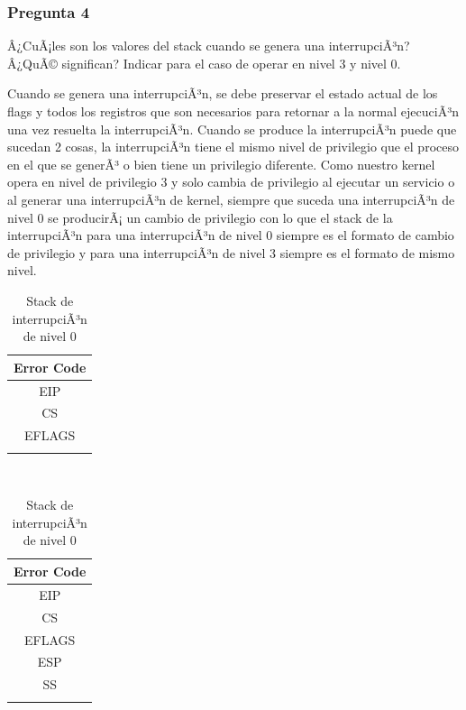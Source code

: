 \documentclass[10pt, a4paper]{article}
\begin{document}
\subsubsection*{Pregunta 4}
 \begin{framed}
Â¿CuÃ¡les son los valores del stack cuando se genera una interrupciÃ³n? Â¿QuÃ© significan? Indicar para el caso de operar en nivel 3 y nivel 0.
\end{framed}
Cuando se genera una interrupciÃ³n, se debe preservar el estado actual de los flags y todos los registros que son necesarios para retornar a la normal ejecuciÃ³n una vez resuelta la interrupciÃ³n.
Cuando se produce la interrupciÃ³n puede que sucedan 2 cosas, la interrupciÃ³n tiene el mismo nivel de privilegio que el proceso en el que se generÃ³ o bien tiene un privilegio diferente. Como nuestro kernel opera en nivel de privilegio 3 y solo cambia de privilegio al ejecutar un servicio o al generar una interrupciÃ³n de kernel, siempre que suceda una interrupciÃ³n de nivel 0 se producirÃ¡ un cambio de privilegio con lo que el stack de la interrupciÃ³n para una interrupciÃ³n de nivel 0 siempre es el formato de cambio de privilegio y para una interrupciÃ³n de nivel 3 siempre es el formato de mismo nivel.

\begin{table}[h]
	\begin{subtable}[h]{0.5\textwidth}
		\begin{minipage}{0.7\textwidth}
			\hspace*{0.3\textwidth}
			\begin{tabular}{|c|}
				\\ \hline
				Error Code \\ \hline
				EIP \\ \hline
				CS \\ \hline
				EFLAGS \\ \hline
				\\
			\end{tabular}
			\caption{Stack de interrupciÃ³n de nivel 3}
		\end{minipage}
	\end{subtable}
~
	\begin{subtable}[h]{0.5\textwidth}
		\begin{minipage}{0.7\textwidth}
			\hspace*{0.3\textwidth}
			\begin{tabular}{|c|}
				\\ \hline
				Error Code \\ \hline
				EIP \\ \hline
				CS \\ \hline
				EFLAGS \\ \hline
				ESP \\ \hline
				SS \\ \hline
				\\
			\end{tabular}
			\caption{Stack de interrupciÃ³n de nivel 0}
		\end{minipage}
	\end{subtable}
\end{table}
\end{document}
